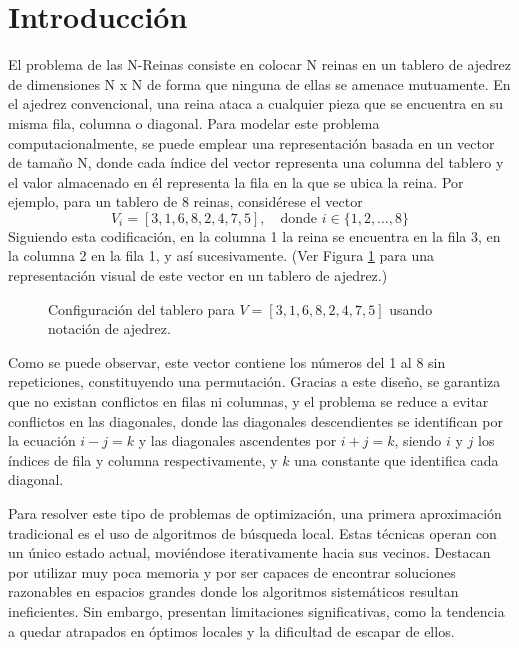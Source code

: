 \documentclass[11pt,a4paper,twocolumn]{article}
\begin{document}
\section{Introducción}
El problema de las N-Reinas consiste en colocar N reinas en un tablero de ajedrez de dimensiones N x N de forma que ninguna de ellas se amenace mutuamente. En el ajedrez convencional, una reina ataca a cualquier pieza que se encuentra en su misma fila, columna o diagonal. 
Para modelar este problema computacionalmente, se puede emplear una representación basada en un vector de tamaño N, donde cada índice del vector representa una columna del tablero y el valor almacenado en él representa la fila en la que se ubica la reina. \cite{wiki_nreinas}
Por ejemplo, para un tablero de 8 reinas, considérese el vector
\begin{equation*}
    V_i = [3, 1, 6, 8, 2, 4, 7, 5], \quad \text{donde } i \in \{1, 2, \dots, 8\}
\end{equation*}
Siguiendo esta codificación, en la columna 1 la reina se encuentra en la fila 3, en la columna 2 en la fila 1, y así sucesivamente. (Ver Figura \ref{fig:tablero_jedrez} para una representación visual de este vector en un tablero de ajedrez.)

\begin{figure}[H]
    \centering
    \chessboard[
        setfen=8/8/8/8/8/8/8/8 w - - 0 1, %
        pgf=true,
        addpieces={
            Qa3, Qb1, Qc6, Qd8, Qe2, Qf4, Qg7, Qh5
        },
        showmover=false,
        maxfield=h8
    ]
    \caption{Configuración del tablero para $V = [3, 1, 6, 8, 2, 4, 7, 5]$ usando notación de ajedrez.}
    \label{fig:tablero_jedrez}
\end{figure}

Como se puede observar, este vector contiene los números del 1 al 8 sin repeticiones, constituyendo una permutación. Gracias a este diseño, se garantiza que no existan conflictos en filas ni columnas, y el problema se reduce a evitar conflictos en las diagonales, donde las diagonales descendientes se identifican por la ecuación $i - j = k$ y las diagonales ascendentes por $i + j = k$, siendo $i$ y $j$ los índices de fila y columna respectivamente, y $k$ una constante que identifica cada diagonal. \cite{wiki_nreinas}

Para resolver este tipo de problemas de optimización, una primera aproximación tradicional es el uso de algoritmos de búsqueda local. Estas técnicas operan con un único estado actual, moviéndose iterativamente hacia sus vecinos. Destacan por utilizar muy poca memoria y por ser capaces de encontrar soluciones razonables en espacios grandes donde los algoritmos sistemáticos resultan ineficientes.\cite{russell} Sin embargo, presentan limitaciones significativas, como la tendencia a quedar atrapados en óptimos locales y la dificultad de escapar de ellos. \cite{inaoe}
\end{document}
